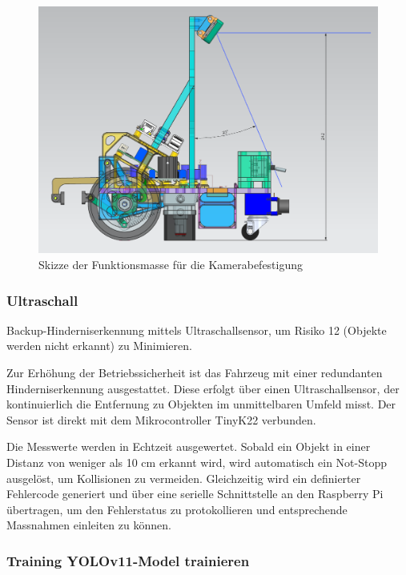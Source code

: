  \begin{figure}[H]
\centering
\includegraphics[width= \textwidth ]{assets/MT/Sichtfeld_Roboter.png}
\caption{Skizze der Funktionsmasse für die Kamerabefestigung}
\label{fig:Skizze der Funktionsmasse für die Kamerabefestigung}
\end{figure}


\subsubsection{Ultraschall}
\label{ultraschall}

Backup-Hinderniserkennung mittels Ultraschallsensor, um Risiko 12 (Objekte werden nicht erkannt) zu Minimieren.

Zur Erhöhung der Betriebssicherheit ist das Fahrzeug mit einer redundanten Hinderniserkennung ausgestattet. Diese erfolgt über einen Ultraschallsensor, der kontinuierlich die Entfernung zu Objekten im unmittelbaren Umfeld misst. Der Sensor ist direkt mit dem Mikrocontroller TinyK22 verbunden.

Die Messwerte werden in Echtzeit ausgewertet. Sobald ein Objekt in einer Distanz von weniger als 10 cm erkannt wird, wird automatisch ein Not-Stopp ausgelöst, um Kollisionen zu vermeiden. Gleichzeitig wird ein definierter Fehlercode generiert und über eine serielle Schnittstelle an den Raspberry Pi übertragen, um den Fehlerstatus zu protokollieren und entsprechende Massnahmen einleiten zu können.

\subsubsection{Training YOLOv11-Model trainieren}



